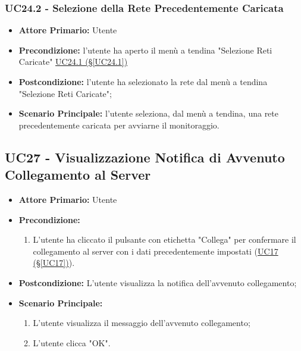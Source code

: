 \subsubsection{UC24.2 - Selezione della Rete Precedentemente Caricata}\label{UC24.2}
\begin{itemize}
	\item \textbf{Attore Primario:} Utente
	\item \textbf{Precondizione:}  l'utente ha aperto il menù a tendina "Selezione Reti Caricate" \hyperref[UC24.1]{UC24.1 (§\ref*{UC24.1})}
	\item \textbf{Postcondizione:} l'utente ha selezionato la rete dal menù a tendina "Selezione Reti Caricate";
	\item \textbf{Scenario Principale:} l'utente seleziona, dal menù a tendina, una rete precedentemente caricata per avviarne il monitoraggio. 
\end{itemize}

\pagebreak

\subsection{UC27 - Visualizzazione Notifica di Avvenuto Collegamento al Server}\label{UC27}
\begin{itemize}
	\item \textbf{Attore Primario:}  Utente
	\item \textbf{Precondizione:} 
	\begin{enumerate}
		\item L'utente ha cliccato il pulsante con etichetta "Collega" per confermare il collegamento al server con i dati precedentemente impostati (\hyperref[UC17]{UC17 (§\ref*{UC17})}).
	\end{enumerate}	
	\item \textbf{Postcondizione:} L'utente visualizza la notifica dell'avvenuto collegamento;
	\item \textbf{Scenario Principale:}
	\begin{enumerate}
		\item L'utente visualizza il messaggio dell'avvenuto collegamento;
		\item L'utente clicca "OK".
	\end{enumerate}
\end{itemize}

